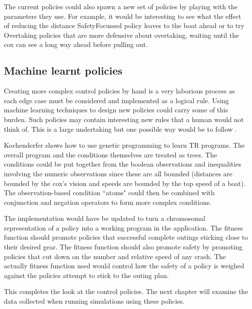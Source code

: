 The current policies could also spawn a new set of policies by playing with the parameters they use. For example, it would be interesting to see what the effect of reducing the distance SafetyFocussed policy leaves to the boat ahead or to try Overtaking policies that are more defensive about overtaking, waiting until the cox can see a long way ahead before pulling out.

\subsection{Machine learnt policies}
Creating more complex control policies by hand is a very laborious process as each edge case must be considered and implemented as a logical rule. Using machine learning techniques to design new policies could carry some of this burden. Such policies may contain interesting new rules that a human would not think of. This is a large undertaking but one possible way would be to follow \textcite{Kochenderfer2003}. 

Kochenderfer shows how to use genetic programming to learn TR programs. The overall program and the conditions themselves are treated as trees. The conditions could be put together from the boolean observations and inequalities involving the numeric observations since these are all bounded (distances are bounded by the cox's vision and speeds are bounded by the top speed of a boat). The observation-based condition ``atoms" could then be combined with conjunction and negation operators to form more complex conditions.

The implementation would have be updated to turn a chromosomal representation of a policy into a working program in the application. The fitness function should promote policies that successful complete outings sticking close to their desired gear. The fitness function should also promote safety by promoting policies that cut down on the number and relative speed of any crash. The actually fitness function used would control how the safety of a policy is weighed against the policies attempt to stick to the outing plan.

This completes the look at the control policies. The next chapter will examine the data collected when running simulations using these policies.